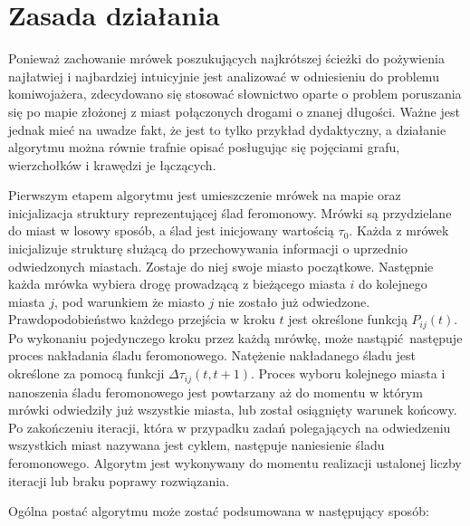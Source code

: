 {    %
    \section{Zasada działania}
    {
        Ponieważ zachowanie mrówek poszukujących najkrótszej ścieżki do pożywienia najłatwiej i najbardziej intuicyjnie
        jest analizować w odniesieniu do problemu komiwojażera, zdecydowano się stosować słownictwo oparte o problem
        poruszania się po mapie złożonej z miast połączonych drogami o znanej długości. Ważne jest jednak mieć na uwadze
        fakt, że jest to tylko przykład dydaktyczny, a działanie algorytmu można równie trafnie opisać posługując się
        pojęciami grafu, wierzchołków i krawędzi je łączących.

        Pierwszym etapem algorytmu jest umieszczenie mrówek na mapie oraz inicjalizacja struktury reprezentującej ślad
        feromonowy. Mrówki są przydzielane do miast w losowy sposób, a ślad jest inicjowany wartością $\tau_0$. Każda z
        mrówek inicjalizuje strukturę służącą do przechowywania informacji o uprzednio odwiedzonych miastach. Zostaje do
        niej swoje miasto początkowe. Następnie każda mrówka wybiera drogę prowadzącą z bieżącego miasta $i$ do
        kolejnego miasta $j$, pod warunkiem że miasto $j$ nie zostało już odwiedzone. Prawdopodobieństwo każdego
        przejścia w kroku $t$ jest określone funkcją $P_{ij}(t)$. Po wykonaniu pojedynczego kroku przez każdą mrówkę,
        może nastąpić następuje proces nakładania śladu feromonowego. Natężenie nakładanego śladu jest określone za
        pomocą funkcji $\Delta\tau_{ij}(t, t+1)$. Proces wyboru kolejnego miasta i nanoszenia śladu feromonowego jest
        powtarzany aż do momentu w którym mrówki odwiedziły już wszystkie miasta, lub został osiągnięty warunek końcowy.
        Po zakończeniu iteracji, która w przypadku zadań polegających na odwiedzeniu wszystkich miast nazywana jest
        cyklem, następuje naniesienie śladu feromonowego. Algorytm jest wykonywany do momentu realizacji ustalonej
        liczby iteracji lub braku poprawy rozwiązania\cite{Dorigo1991AntSA}.

        Ogólna postać algorytmu może zostać podsumowana w następujący sposób:

}}
